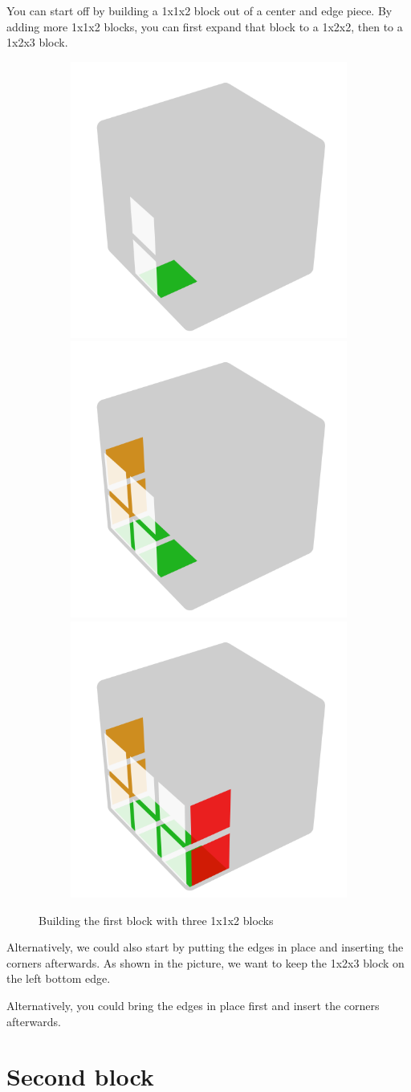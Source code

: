 \documentclass[a4paper]{scrreprt}
\begin{document}
You can start off by building a 1x1x2 block out of a center and edge piece. By adding more 1x1x2 blocks, you can first expand that block to a 1x2x2, then to a 1x2x3 block.\par

\begin{figure}[h]
\centering
\begin{subfigure}{.9\textwidth}
  \includegraphics[width=.3\linewidth]{resources/fb_1.png}
  \includegraphics[width=.3\linewidth]{resources/fb_2.png}
  \includegraphics[width=.3\linewidth]{resources/fb_3.png}
\end{subfigure}
\caption*{Building the first block with three 1x1x2 blocks}
\end{figure}

Alternatively, we could also start by putting the edges in place and inserting the corners afterwards. As shown in the picture, we want to keep the 1x2x3 block on the left bottom edge.

Alternatively, you could bring the edges in place first and insert the corners afterwards.


\section{Second block}
\end{document}
